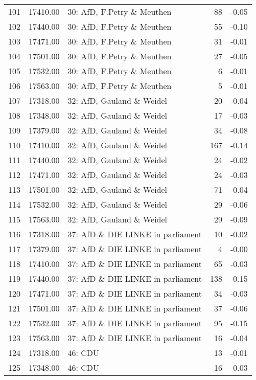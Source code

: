 \begin{table}[ht]
\begin{tabular}{rrlrr}
  101 & 17410.00 & 30: AfD, F.Petry \& Meuthen &  88 & -0.05 \\ 
  102 & 17440.00 & 30: AfD, F.Petry \& Meuthen &  55 & -0.10 \\ 
  103 & 17471.00 & 30: AfD, F.Petry \& Meuthen &  31 & -0.01 \\ 
  104 & 17501.00 & 30: AfD, F.Petry \& Meuthen &  27 & -0.05 \\ 
  105 & 17532.00 & 30: AfD, F.Petry \& Meuthen &   6 & -0.01 \\ 
  106 & 17563.00 & 30: AfD, F.Petry \& Meuthen &   5 & -0.01 \\ 
  107 & 17318.00 & 32: AfD, Gauland \& Weidel &  20 & -0.04 \\ 
  108 & 17348.00 & 32: AfD, Gauland \& Weidel &  17 & -0.03 \\ 
  109 & 17379.00 & 32: AfD, Gauland \& Weidel &  34 & -0.08 \\ 
  110 & 17410.00 & 32: AfD, Gauland \& Weidel & 167 & -0.14 \\ 
  111 & 17440.00 & 32: AfD, Gauland \& Weidel &  24 & -0.02 \\ 
  112 & 17471.00 & 32: AfD, Gauland \& Weidel &  24 & -0.03 \\ 
  113 & 17501.00 & 32: AfD, Gauland \& Weidel &  71 & -0.04 \\ 
  114 & 17532.00 & 32: AfD, Gauland \& Weidel &  29 & -0.06 \\ 
  115 & 17563.00 & 32: AfD, Gauland \& Weidel &  29 & -0.09 \\ 
  116 & 17318.00 & 37: AfD \& DIE LINKE in parliament &  10 & -0.02 \\ 
  117 & 17379.00 & 37: AfD \& DIE LINKE in parliament &   4 & -0.00 \\ 
  118 & 17410.00 & 37: AfD \& DIE LINKE in parliament &  65 & -0.03 \\ 
  119 & 17440.00 & 37: AfD \& DIE LINKE in parliament & 138 & -0.15 \\ 
  120 & 17471.00 & 37: AfD \& DIE LINKE in parliament &  34 & -0.03 \\ 
  121 & 17501.00 & 37: AfD \& DIE LINKE in parliament &  37 & -0.06 \\ 
  122 & 17532.00 & 37: AfD \& DIE LINKE in parliament &  95 & -0.15 \\ 
  123 & 17563.00 & 37: AfD \& DIE LINKE in parliament &  16 & -0.04 \\ 
  124 & 17318.00 & 46: CDU &  13 & -0.01 \\ 
  125 & 17348.00 & 46: CDU &  16 & -0.03 \\ 

\end{tabular}
\end{table}
